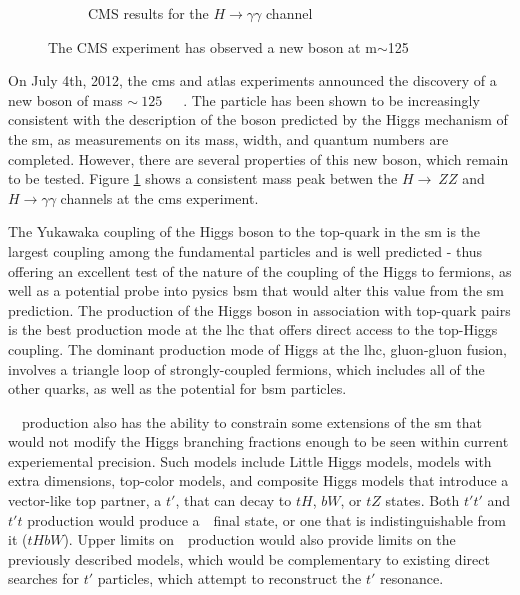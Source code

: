 \begin{figure}
\begin{subfigure}[b]{0.3\textwidth}
          \caption{CMS results for the $H\rightarrow\gamma\gamma$ channel}
      \end{subfigure}
      \caption{The CMS experiment has observed a new boson at m$\sim$125\GeVcc} \label{fig:cms_hZZ_hgg_results}
\end{figure}

\par On July 4th, 2012, the \acrfull{cms} and \acrfull{atlas} experiments announced the discovery of a new boson of mass $\sim~125$~\GeVcc~\cite{CMS:2012discovery}~\cite{ATLAS:2012discovery}.  The particle has been shown to be increasingly consistent with the description of the boson predicted by the Higgs mechanism of the \acrshort{sm}, as measurements on its mass, width, and quantum numbers are completed.  However, there are several properties of this new boson, which remain to be tested.  Figure \ref{fig:cms_hZZ_hgg_results} shows a consistent mass peak betwen the $H\rightarrow~ZZ$ and $H\rightarrow\gamma\gamma$ channels at the \acrshort{cms} experiment.  

\par The Yukawaka coupling of the Higgs boson to the top-quark in the \acrshort{sm} is the largest coupling among the fundamental particles and is well 
predicted - thus offering an excellent test of the nature of the coupling of the Higgs to fermions, as well as a potential probe into pysics \acrfull{bsm} that would alter this value from the \acrshort{sm} prediction.  The production of the Higgs boson in association with top-quark pairs is the best production mode at the \acrshort{lhc} that offers direct access to the top-Higgs coupling.  The dominant production mode of Higgs at the \acrshort{lhc}, gluon-gluon fusion, involves a triangle loop of strongly-coupled fermions, which includes all of the other quarks, as well as the potential for \acrshort{bsm} particles.  

\par ~\ttH~production also has the ability to constrain some extensions of the \acrshort{sm} that would not modify the Higgs branching fractions enough to be seen 
within current experiemental precision.  Such models include Little Higgs models, models with extra dimensions, top-color models, and composite Higgs models that introduce a vector-like top partner, a $t'$, that can decay to $tH$, $bW$, or $tZ$ states.  Both $t't'$ and $t't$ production would produce a~\ttH~final state, or one that is indistinguishable from it ($tHbW$).  Upper limits on~\ttH~production would also provide limits on the previously described models, which would be complementary to existing direct searches for $t'$ particles, which attempt to reconstruct the $t'$ resonance.  

